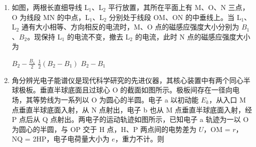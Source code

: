 \documentclass[\gkver]{gaokaozhenti}
\begin{document}
\begin{enumerate}
{B．根据图 b 可知，输入电压最大值 $U_{m} = 48\sqrt{2} \UV$，则输入电压有效值为 $U_{1} = \frac{U_{m}}{\sqrt{2}} = 48 \UV$，根据变压比可知，副线圈电压即电压表示数为 $U_{2} = \frac{n_{2}}{n_{1}}U_{1} = 12 \UV$，故 B 正确；

C．$R_{1}$ 的阻值为 $R_{2}$ 的 2 倍，根据并联规律可知，两电阻的电压相同，根据欧姆定律可知，流经 $R_{1}$ 和 $R_{2}$ 的电流之比为 $1:2$，副线圈干路电流等于流经两电阻的电流之和，则副线圈干路的电流为 $R_{1}$ 电流的 3 倍，故 C 错误；

D．根据变压器的原理可知，原副线圈功率相同，故 D 错误。

故选 B。
}

\item
如图，两根长直细导线 L$_{1}$、L$_{2}$ 平行放置，其所在平面上有 M、O、N 三点，O 为线段 MN 的中点，L$_{1}$、L$_{2}$ 分别处于线段 OM、ON 的中垂线上。当 L$_{1}$、L$_{2}$ 通有大小相等、方向相反的电流时，M、O 点的磁感应强度大小分别为 $B_{1}$、$B_{2}$。现保持 L$_{1}$ 的电流不变，撤去 L$_{2}$ 的电流，此时 N 点的磁感应强度大小为

\onepicture[w=6.2cm]{}

{$B_{2} - \frac{B_{1}}{2}$}
{$\frac{1}{2}(B_{2} - B_{1})$}
{$B_{2} - B_{1}$}


\item
角分辨光电子能谱仪是现代科学研究的先进仪器，其核心装置中有两个同心半球极板。垂直半球底面且过球心 O 的截面如图所示。极板间存在一径向电场，其等势线为一系列以 O 为圆心的半圆。电子 a 以初动能 $E_{k}$，从入口 M 点垂直半球底面入射，从 N 点射出，电子 b 也从 M 点垂直半球底面入射，经 P 点后从 Q 点射出。两电子的运动轨迹如图所示，已知电子 a 轨迹为一以 O 为圆心的半圆，与 OP 交于 H 点，H、P 两点间的电势差为 $U$，OM = $r$，NQ = 2HP，电子电荷量大小为 $e$，重力不计。则


\end{enumerate}
\end{document}
